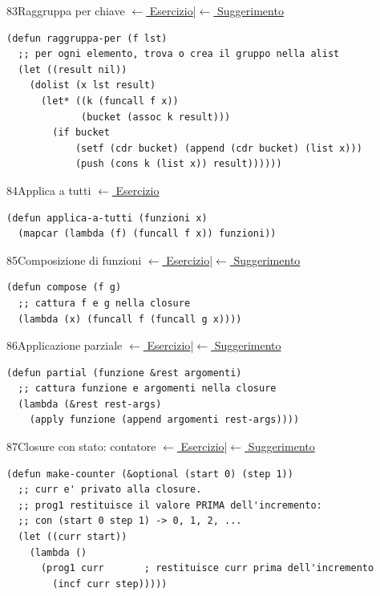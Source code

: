 \label{sol:83}
\begin{solbox}{83}{Raggruppa per chiave}
\small\color{black!55}\hyperref[ex:83]{$\leftarrow$ Esercizio}\enspace\textcolor{black!30}{|}\enspace\hyperref[hint:83]{$\leftarrow$ Suggerimento}\normalsize\color{black}
\begin{lstlisting}
(defun raggruppa-per (f lst)
  ;; per ogni elemento, trova o crea il gruppo nella alist
  (let ((result nil))
    (dolist (x lst result)
      (let* ((k (funcall f x))
             (bucket (assoc k result)))
        (if bucket
            (setf (cdr bucket) (append (cdr bucket) (list x)))
            (push (cons k (list x)) result))))))
\end{lstlisting}
\end{solbox}

\label{sol:84}
\begin{solbox}{84}{Applica a tutti}
\small\color{black!55}\hyperref[ex:84]{$\leftarrow$ Esercizio}\normalsize\color{black}
\begin{lstlisting}
(defun applica-a-tutti (funzioni x)
  (mapcar (lambda (f) (funcall f x)) funzioni))
\end{lstlisting}
\end{solbox}

\label{sol:85}
\begin{solbox}{85}{Composizione di funzioni}
\small\color{black!55}\hyperref[ex:85]{$\leftarrow$ Esercizio}\enspace\textcolor{black!30}{|}\enspace\hyperref[hint:85]{$\leftarrow$ Suggerimento}\normalsize\color{black}
\begin{lstlisting}
(defun compose (f g)
  ;; cattura f e g nella closure
  (lambda (x) (funcall f (funcall g x))))
\end{lstlisting}
\end{solbox}

\label{sol:86}
\begin{solbox}{86}{Applicazione parziale}
\small\color{black!55}\hyperref[ex:86]{$\leftarrow$ Esercizio}\enspace\textcolor{black!30}{|}\enspace\hyperref[hint:86]{$\leftarrow$ Suggerimento}\normalsize\color{black}
\begin{lstlisting}
(defun partial (funzione &rest argomenti)
  ;; cattura funzione e argomenti nella closure
  (lambda (&rest rest-args)
    (apply funzione (append argomenti rest-args))))
\end{lstlisting}
\end{solbox}

\label{sol:87}
\begin{solbox}{87}{Closure con stato: contatore}
\small\color{black!55}\hyperref[ex:87]{$\leftarrow$ Esercizio}\enspace\textcolor{black!30}{|}\enspace\hyperref[hint:87]{$\leftarrow$ Suggerimento}\normalsize\color{black}
\begin{lstlisting}
(defun make-counter (&optional (start 0) (step 1))
  ;; curr e' privato alla closure.
  ;; prog1 restituisce il valore PRIMA dell'incremento:
  ;; con (start 0 step 1) -> 0, 1, 2, ...
  (let ((curr start))
    (lambda ()
      (prog1 curr       ; restituisce curr prima dell'incremento
        (incf curr step)))))
\end{lstlisting}
\end{solbox}

